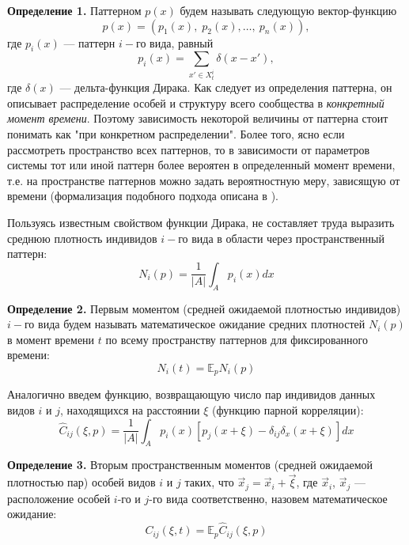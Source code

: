 \textbf{Определение 1.} Паттерном $p(x)$ будем называть следующую вектор-функцию
\begin{equation*}
p(x)=\left(p_{1}(x),\;p_{2}(x),\ldots,\:p_{n}(x)\right), 
\end{equation*}
где $ p_{i}(x) $ --- паттерн $ i- $го вида, равный
\begin{equation*}
p_{i}(x)=\sum_{x'\in X_t^i}\delta(x-x'),
\end{equation*}
где $ \delta(x) $ --- дельта-функция Дирака. Как следует из определения паттерна, он описывает распределение особей и структуру всего сообщества в \textit{конкретный момент времени}. Поэтому зависимость некоторой величины от паттерна стоит понимать как "при конкретном распределении". Более того, ясно если рассмотреть пространство всех паттернов, то в зависимости  от параметров системы тот или иной паттерн более вероятен в определенный момент времени, т.е. на пространстве паттернов можно задать вероятностную меру, зависящую от времени (формализация подобного подхода описана в \cite{egor}).

Пользуясь известным свойством функции Дирака, не составляет труда выразить среднюю плотность индивидов $ i- $го вида в области через пространственный паттерн:
\begin{equation*}
N_{i}(p)=\frac{1}{|A|}\int_{A}p_{i}(x)dx
\end{equation*}

\textbf{Определение 2.} Первым моментом (средней ожидаемой плотностью индивидов) $ i- $го вида будем называть математическое ожидание средних плотностей $N_{i}(p)$ в момент времени $t$ по всему пространству паттернов для фиксированного времени:
\begin{equation*}
N_{i}(t)=\mathbb{E}_{p}N_{i}(p)
\end{equation*}

Аналогично введем функцию, возвращающую число пар индивидов данных видов $ i $ и $ j $, находящихся на расстоянии $ \xi $ (функцию парной корреляции):
\begin{equation*}
\hat{C}_{ij}(\xi,p)=\frac{1}{|A|}\int_{A}p_{i}(x)[p_{j}(x+\xi)-\delta_{ij}\delta_{x}(x+\xi)]dx
\end{equation*}

\textbf{Определение 3.} Вторым пространственным моментов (средней ожидаемой плотностью пар) особей видов $ i $ и $ j $ таких, что $\vec{x}_j=\vec{x}_i+\vec{\xi}$, где $\vec{x}_i$, $\vec{x}_j$ --- расположение особей $i$-го и $j$-го вида соответственно, назовем математическое ожидание:
\begin{equation*}
C_{ij}(\xi,t)=\mathbb{E}_{p}\hat{C}_{ij}(\xi,p)
\end{equation*}

